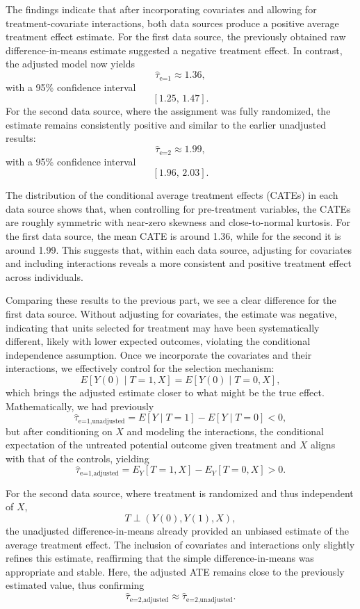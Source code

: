\documentclass{article}
\begin{document}
The findings indicate that after incorporating covariates and allowing for treatment-covariate interactions, both data sources produce a positive average treatment effect estimate. For the first data source, the previously obtained raw difference-in-means estimate suggested a negative treatment effect. In contrast, the adjusted model now yields 
\[
\widehat{\tau}_{\text{e=1}} \approx 1.36,
\]
with a 95\% confidence interval 
\[
[1.25,\, 1.47].
\]
For the second data source, where the assignment was fully randomized, the estimate remains consistently positive and similar to the earlier unadjusted results:
\[
\widehat{\tau}_{\text{e=2}} \approx 1.99,
\]
with a 95\% confidence interval 
\[
[1.96,\, 2.03].
\]

The distribution of the conditional average treatment effects (CATEs) in each data source shows that, when controlling for pre-treatment variables, the CATEs are roughly symmetric with near-zero skewness and close-to-normal kurtosis. For the first data source, the mean CATE is around 1.36, while for the second it is around 1.99. This suggests that, within each data source, adjusting for covariates and including interactions reveals a more consistent and positive treatment effect across individuals.

Comparing these results to the previous part, we see a clear difference for the first data source. Without adjusting for covariates, the estimate was negative, indicating that units selected for treatment may have been systematically different, likely with lower expected outcomes, violating the conditional independence assumption. Once we incorporate the covariates and their interactions, we effectively control for the selection mechanism:
\[
E[Y(0) \mid T=1,X] = E[Y(0) \mid T=0,X],
\]
which brings the adjusted estimate closer to what might be the true effect. Mathematically, we had previously
\[
\widehat{\tau}_{\text{e=1,unadjusted}} = E[Y \mid T=1] - E[Y \mid T=0] < 0,
\]
but after conditioning on \( X \) and modeling the interactions, the conditional expectation of the untreated potential outcome given treatment and \( X \) aligns with that of the controls, yielding
\[
\widehat{\tau}_{\text{e=1,adjusted}} = E_Y[T=1,X]-E_Y[T=0,X] > 0.
\]

For the second data source, where treatment is randomized and thus independent of \( X \),
\[
T \perp (Y(0), Y(1), X),
\]
the unadjusted difference-in-means already provided an unbiased estimate of the average treatment effect. The inclusion of covariates and interactions only slightly refines this estimate, reaffirming that the simple difference-in-means was appropriate and stable. Here, the adjusted ATE remains close to the previously estimated value, thus confirming
\[
\widehat{\tau}_{\text{e=2,adjusted}} \approx \widehat{\tau}_{\text{e=2,unadjusted}}.
\]
\end{document}
